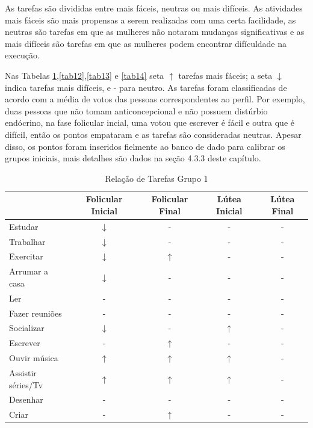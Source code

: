 As tarefas são divididas entre mais fáceis, neutras ou mais difíceis. As atividades mais fáceis 
são mais propensas a serem realizadas com uma certa facilidade, as neutras são tarefas em que as mulheres não 
notaram mudanças significativas e as mais difíceis são tarefas em que as mulheres podem encontrar difículdade 
na execução.

Nas Tabelas \ref{tab11},\ref{tab12},\ref{tab13} e \ref{tab14} seta $\uparrow$ tarefas mais fáceis; a seta $\downarrow$ indica tarefas mais difíceis, e - para neutro. As tarefas 
foram classificadas de acordo com a média de votos das pessoas correspondentes ao perfil. Por exemplo, duas 
pessoas que não tomam anticoncepcional e não possuem distúrbio endócrino, na fase folicular incial, 
uma votou que escrever é fácil e outra que é difícil, então os pontos empataram e as tarefas são consideradas neutras.
Apesar disso, os pontos foram inseridos fielmente ao banco de dado para calibrar os grupos iniciais, mais detalhes são dados
na seção 4.3.3 deste capítulo.

\begin{table}[]
    \centering
    \caption{Relação de Tarefas Grupo 1}
    \label{tab11}
    \begin{tabular}{|l|c|c|c|c|}
    \hline
    \rowcolor[HTML]{C0C0C0} 
    \multicolumn{1}{|c|}{\cellcolor[HTML]{C0C0C0}Tarefas recomendadas}  & Folicular Inicial & Folicular Final  & Lútea Inicial& Lútea Final \\ \hline
    Estudar & $\downarrow$  & - & - & - \\ \hline
    \rowcolor[HTML]{EFEFEF} 
    Trabalhar & $\downarrow$ & -  & -&  -  \\ \hline
    Exercitar & $\downarrow$ & $\uparrow$ & - &  -  \\ \hline
    \rowcolor[HTML]{EFEFEF} 
    Arrumar a casa  & $\downarrow$ & -  & - & - \\ \hline
    Ler & - & -  & - & - \\ \hline
    \rowcolor[HTML]{EFEFEF} 
    Fazer reuniões & - & - & - & - \\ \hline
    \rowcolor[HTML]{EFEFEF} 
    Socializar & $\downarrow$ & - & $\uparrow$ & - \\ \hline
    \rowcolor[HTML]{EFEFEF} 
    Escrever & - & $\uparrow$  & - & - \\ \hline
    Ouvir música & $\uparrow$ & $\uparrow$ & $\uparrow$ & - \\ \hline
    \rowcolor[HTML]{EFEFEF} 
    Assistir séries/Tv & $\uparrow$ & $\uparrow$ & $\uparrow$ & - \\ \hline
    Desenhar & - & -  & - & - \\ \hline
    \rowcolor[HTML]{EFEFEF} 
    Criar & - & $\uparrow$  & - & - \\ \hline
    \end{tabular}
    \end{table}

